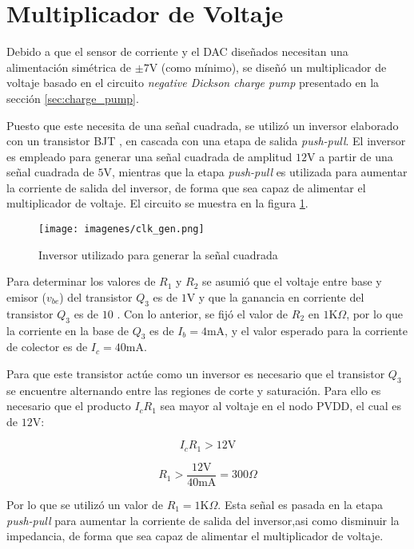 \section{Multiplicador de Voltaje}

    Debido a que el sensor de corriente y el DAC diseñados necesitan una
    alimentación simétrica de $\pm 7\text{V}$ (como mínimo), se diseñó 
    un multiplicador de voltaje basado en el circuito \textit{negative 
    Dickson charge pump} presentado en la sección \ref{sec:charge_pump}.


    Puesto que este necesita de una señal cuadrada, se utilizó un inversor
    elaborado con un transistor BJT , en cascada con una etapa de salida 
    \textit{push-pull}. El inversor es empleado para generar una señal
    cuadrada de amplitud $12\text{V}$ a partir de una señal cuadrada 
    de $5\text{V}$, mientras que la etapa \textit{push-pull}
    es utilizada para aumentar la corriente de salida del inversor, de forma
    que sea capaz de alimentar el multiplicador de voltaje. El circuito
    se muestra en la figura \ref{fig:inversor}.
    
    \begin{figure}[H]
        \centering
        \texttt{[image: imagenes/clk\_gen.png]}
        \caption{Inversor utilizado para generar la señal cuadrada}
        \label{fig:inversor}
    \end{figure}

    Para determinar los valores de $R_1$ y $R_2$
    se asumió que el voltaje entre base y emisor ($v_{be}$) del transistor $Q_3$
    es de $1\text{V}$  y que la ganancia en corriente del 
    transistor $Q_3$ es de $10$ \cite{mmtb5551}. Con lo anterior, se fijó el 
    valor de $R_2$ en $1\text{K}\Omega$, por 
    lo que la corriente en la base de $Q_3$ es de $I_b = 4\text{mA}$, y el valor
     esperado para la corriente de colector es de $I_c = 40\text{mA}$.

    Para que este transistor actúe como un inversor es necesario que 
    el transistor $Q_3$ se encuentre alternando entre
    las regiones de corte y saturación. Para ello es necesario
    que el producto $I_cR_1$ sea mayor al voltaje en el nodo PVDD, el cual
    es de $12\text{V}$:
    
    $$
        I_cR_1 > 12\text{V}
    $$
    
   
    $$
        R_1 > \frac{12\text{V}}{40\text{mA}} = 300 \Omega
    $$

    
    Por lo que se utilizó un valor de $R_1 = 1\text{K}\Omega$. Esta señal es 
    pasada en la etapa \textit{push-pull} para aumentar la corriente de salida
    del inversor,asi como disminuir la impedancia, de forma que sea 
    capaz de alimentar el multiplicador de voltaje.

